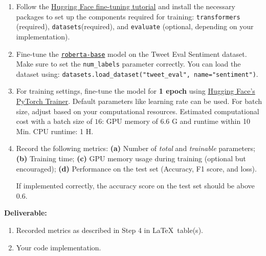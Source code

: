 \documentclass[11pt, oneside]{article}   	%
\begin{document}
\begin{enumerate}
    \item Follow the \href{https://huggingface.co/docs/transformers/training}{Hugging Face fine-tuning tutorial} and install the necessary packages to set up the components required for training: \texttt{transformers} (required), \texttt{datasets}(required), and \texttt{evaluate} (optional, depending on your implementation).
    \item Fine-tune the \texttt{\href{https://huggingface.co/roberta-base}{roberta-base}} model on the Tweet Eval Sentiment dataset. Make sure to set the \texttt{num\_labels} parameter correctly. You can load the dataset using: \texttt{datasets.load\_dataset("tweet\_eval", name="sentiment")}.
    \item For training settings, fine-tune the model for \textbf{1 epoch} using \href{https://huggingface.co/docs/transformers/training#trainer}{Hugging Face's PyTorch Trainer}. Default parameters like learning rate can be used. For batch size, adjust based on your computational resources. Estimated computational cost with a batch size of $16$: GPU memory of 6.6 G and runtime within 10 Min. CPU runtime: 1 H.
    
    \item \label{step4} Record the following metrics: \textbf{(a)} Number of \textit{total} and \textit{trainable} parameters;  \textbf{(b)} Training time; \textbf{(c)} GPU memory usage during training (optional but encouraged); \textbf{(d)} Performance on the test set (Accuracy, F1 score, and loss).

    If implemented correctly, the accuracy score on the test set should be above $0.6$.
\end{enumerate}
\textbf{Deliverable:}
\begin{enumerate}
    \item Recorded metrics as described in Step 4 in \LaTeX~table(s).
    \item Your code implementation.
\end{enumerate}
\end{document}
